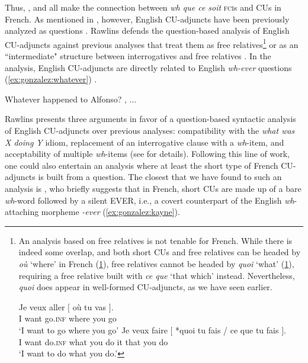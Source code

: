 \documentclass[output=paper]{langscibook}
\begin{document}
Thus, \citet{muller2006}, \citet{vlachou2007} and \citet{corblin2010} all make the connection between \emph{wh que ce soit} \textsc{fci}s and CUs in French. As mentioned in , however, English CU-adjuncts have been previously analyzed as questions \citep{rawlins2013}. Rawlins defends the question-based analysis of English CU-adjuncts against previous analyses that treat them as free relatives\footnote{An analysis based on free relatives is not tenable for French. While there is indeed some overlap, and both short CUs and free relatives can be headed by \emph{où} `where' in French (\ref{ex:gonzalez:french-fr-a}), free relatives cannot be headed by \emph{quoi} `what' (\ref{ex:gonzalez:french-fr-b}), requiring a free relative built with \emph{ce que} `that which' instead. Nevertheless, \emph{quoi} does appear in well-formed CU-adjuncts, as we have seen earlier. 

\ea 
    \ea \label{ex:gonzalez:french-fr-a}
    \gll Je veux aller $[$ où tu vas $]$. \\
    I want go.\textsc{inf} {} where you go \\
    \glt `I want to go where you go'
    \ex \label{ex:gonzalez:french-fr-b}
    \gll Je veux faire $[$ *quoi tu fais / ce que tu fais $]$. \\
    I want do.\textsc{inf} {} what you do {} it that you do \\
    \glt `I want to do what you do.'
    \z 
\z} \citep{dayal1997, izvorski2000} or as an ``intermediate" structure between interrogatives and free relatives \citep{gawron2001}. In the analysis, English CU-adjuncts are directly related to English \emph{wh-ever} questions (\ref{ex:gonzalez:whatever}) \citep[][148]{rawlins2013}.

\ea \label{ex:gonzalez:whatever}
    \ea Whatever happened to Alfonso? 
    , ...
    \z
\z
 
 Rawlins presents three arguments in favor of a question-based syntactic analysis of English CU-adjuncts over previous analyses: compatibility with the \textit{what was X doing Y} idiom, replacement of an interrogative clause with a \emph{wh}-item, and acceptability of multiple \textit{wh}-items (see \citealt[][148--150]{rawlins2013} for  details). Following this line of work, one could also entertain an analysis where at least the short type of French CU-adjuncts is built from a question. The closest that we have found to such an analysis is \citet{kayne2010}, who briefly suggests that in French, short CUs are made up of a bare \emph{wh}-word followed by a silent EVER, i.e., a covert counterpart of the English \emph{wh}-attaching morpheme \emph{-ever} (\ref{ex:gonzalez:kayne}).
 
\end{document}
